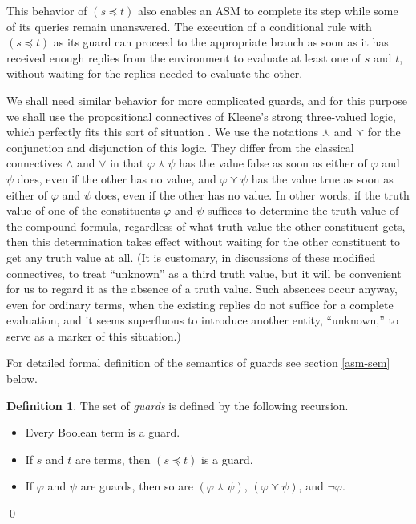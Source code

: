 \documentclass{LMCS}
\theoremstyle{definition}
\newtheorem{df}[thm]{Definition}
\newenvironment{ls}{\begin{itemize}}{\end{itemize}}
\newcommand{\kand}{\curlywedge}
\newcommand{\kor}{\curlyvee}
\renewcommand{\phi}{\varphi}
\begin{document}
This behavior of $(s\preceq t)$ also enables an ASM to complete its
step while some of its queries remain unanswered.  The execution of a
conditional rule with $(s\preceq t)$ as its guard can proceed to the
appropriate branch as soon as it has received enough replies from the
environment to evaluate at least one of $s$ and $t$, without waiting
for the replies needed to evaluate the other.

We shall need similar behavior for more complicated guards, and for
this purpose we shall use the propositional connectives of Kleene's
strong three-valued logic, which perfectly fits this sort of situation
\cite[\S64]{Kleene}.  We use the notations $\kand$ and $\kor$ for the
conjunction and disjunction of this logic.  They differ from the
classical connectives $\land$ and $\lor$ in that $\phi\kand\psi$ has
the value false as soon as either of $\phi$ and $\psi$ does, even if
the other has no value, and $\phi\kor\psi$ has the value true as soon
as either of $\phi$ and $\psi$ does, even if the other has no value.
In other words, if the truth value of one of the constituents $\phi$
and $\psi$ suffices to determine the truth value of the compound
formula, regardless of what truth value the other constituent gets,
then this determination takes effect without waiting for the other
constituent to get any truth value at all.  (It is customary, in
discussions of these modified connectives, to treat ``unknown'' as a
third truth value, but it will be convenient for us to regard it as
the absence of a truth value.  Such absences occur anyway, even for
ordinary terms, when the
existing replies do not suffice for a complete
evaluation, and it seems superfluous to introduce another entity,
``unknown,'' to serve as a marker of this situation.)

For detailed formal definition of the semantics of guards see
section \ref{asm-sem} below.

\begin{df}
  The set of \emph{guards} is defined by the following recursion.
  \begin{ls}
    \item Every Boolean term is a guard.
    \item If $s$ and $t$ are terms, then $(s\preceq t)$ is a guard.
    \item If $\phi$ and $\psi$ are guards, then so are
    $(\phi\kand\psi)$, $(\phi\kor\psi)$, and $\neg\phi$.
  \end{ls}
\qed\end{df}
\end{document}
